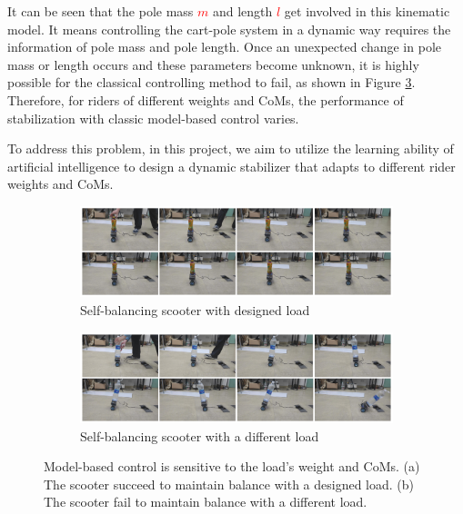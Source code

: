 \documentclass[10pt,a4paper]{article}
\begin{document}
It can be seen that the pole mass \textcolor{red}{$m$} and length \textcolor{red}{$l$} get involved in this kinematic model. It means controlling the cart-pole system in a dynamic way requires the information of pole mass and pole length. Once an unexpected change in pole mass or length occurs and these parameters become unknown, it is highly possible for the classical controlling method to fail, as shown in Figure \ref{fig:different_rider}.
Therefore, for riders of different weights and CoMs, the performance of stabilization with classic model-based control varies. 

To address this problem, in this project, we aim to utilize the learning ability of artificial intelligence to design a dynamic stabilizer that adapts to different rider weights and CoMs.


\begin{figure}
	\centering
	\begin{subfigure}[b]{1\textwidth}
		\centering
		\includegraphics[width=1\linewidth]{figure/success}
		\caption{Self-balancing scooter with designed load}
		\label{fig:success}
	\end{subfigure}
	\hfill
	\begin{subfigure}[b]{1\textwidth}
		\centering
		\includegraphics[width=1\linewidth]{figure/fail}
		\caption{Self-balancing scooter with a different load}
		\label{fig:fail}
	\end{subfigure}
	\caption{Model-based control is sensitive to the load's weight and CoMs. (a) The scooter succeed to maintain balance with a designed load. (b) The scooter fail to maintain balance with a different load.}
	\label{fig:different_rider}
\end{figure}
\end{document}
